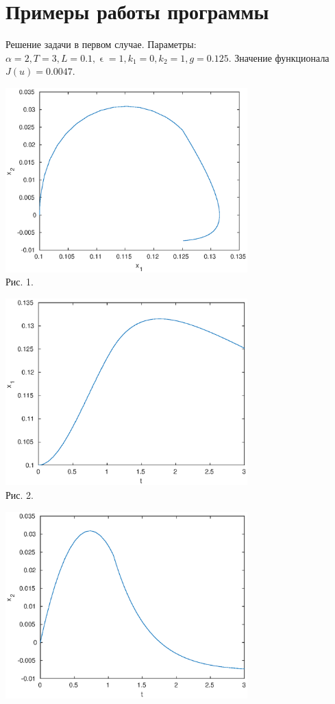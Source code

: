 \documentclass[11pt]{article}
\begin{document}
{{\section{Примеры работы программы}
{Решение задачи в первом случае. Параметры: $\alpha = 2, T = 3, L = 0.1, \upvarepsilon = 1, k_1 = 0,k_2 = 1, g = 0.125$. Значение функционала $J(u) = 0.0047.$}
	\begin{center}
	\includegraphics[width=0.7\textwidth]{x1x2.eps}\\
	{Рис. 1. }
\end{center}
	\begin{center}
	\includegraphics[width=0.7\textwidth]{x1t.eps}\\
	{Рис. 2. }
\end{center}
	\begin{center}
	\includegraphics[width=0.7\textwidth]{x2t.eps}\\

\end{center}}}
\end{document}
